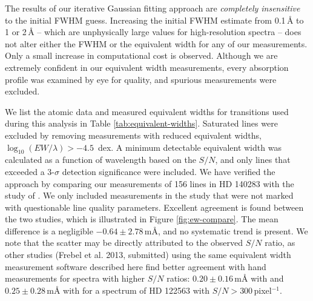 \documentclass{emulateapj}
\begin{document}
The results of our iterative Gaussian fitting approach are \textit{completely insensitive} to the initial FWHM guess. Increasing the initial FWHM estimate from 0.1\,\AA{} to 1 or 2\,\AA{} \--- which are unphysically large values for high-resolution spectra \--- does not alter either the FWHM or the equivalent width for any of our measurements. Only a small increase in computational cost is observed. Although we are extremely confident in our equivalent width measurements, every absorption profile was examined by eye for quality, and spurious measurements were excluded.

We list the atomic data and measured equivalent widths for transitions used during this analysis in Table \ref{tab:equivalent-widths}. Saturated lines were excluded by removing measurements with reduced equivalent widths, $\log_{10}{(EW/\lambda)} > -4.5$\, dex. A minimum detectable equivalent width was calculated as a function of wavelength based on the $S/N$, and only lines that exceeded a 3-$\sigma$ detection significance were included. We have verified the approach by comparing our measurements of 156 lines in HD 140283 with the study of \citet{norris;et-al_1996}. We only included measurements in the \citet{norris;et-al_1996} study that were not marked with questionable line quality parameters. Excellent agreement is found between the two studies, which is illustrated in Figure \ref{fig:ew-compare}. The mean difference is a negligible $-0.64 \pm 2.78$\,m\AA{}, and no systematic trend is present. We note that the scatter may be directly attributed to the observed $S/N$ ratio, as other studies (Frebel et al. 2013, submitted) using the same equivalent width measurement software described here find better agreement with hand measurements for spectra with higher $S/N$ ratios: $0.20 \pm 0.16$\,m{\AA} with \citet{aoki;et-al_2007} and $0.25 \pm 0.28$\,m{\AA} with \citet{cayrel;et-al_2004} for a spectrum of HD 122563 with $S/N > 300$\,pixel$^{-1}$.
\end{document}
